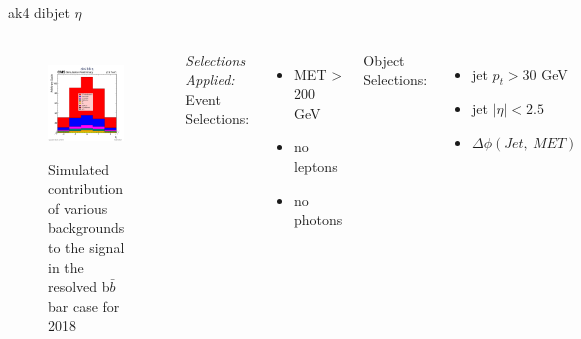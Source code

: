 \documentclass[10pt,xcolor=dvipsnames]{beamer}
\begin{document}
\begin{frame}[fragile]{ak4 dibjet $\eta$ } 
  \begin{columns}
    \begin{figure}
      \centering
      \includegraphics[width=1\textwidth]{../Backgrounds/plots/SR_Resolved_Backgrounds_dijets_eta_Combined.png}
      \label{contribution}
      \caption{Simulated contribution of various backgrounds to the signal in the resolved b$ \bar{b} $ bar case for 2018}
    \end{figure}
    \textit{Selections Applied:} \\
    Event Selections:
    \begin{itemize}
      \raggedright 
      \tiny
      \item {MET > 200 GeV}
      \item {no leptons}
      \item {no photons}
    \end{itemize}
    Object Selections:
    \begin{itemize}
      \raggedright 
      \tiny
      \item {jet $p_t > 30 $ GeV}
      \item {jet $| \eta | < 2.5 $}
      \item {$\Delta \phi (Jet, \ MET)$}

\end{itemize}
\end{columns}
\end{frame}
\end{document}
